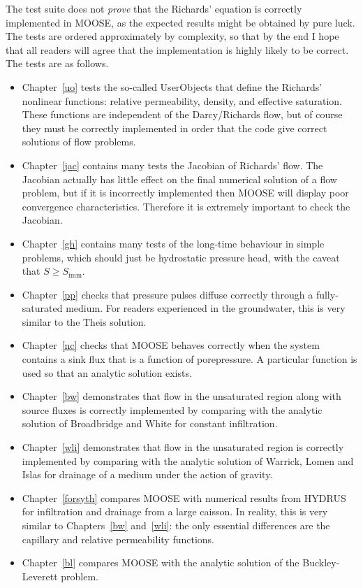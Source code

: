 \documentclass[]{scrreprt}
\begin{document}
The test suite does not {\em prove} that the Richards' equation is
correctly implemented in MOOSE, as the expected results might be
obtained by pure luck.  The tests are ordered approximately by
complexity, so that by the end I hope that all readers will agree that
the implementation is highly likely to be correct.  The tests are as
follows.
\begin{itemize}
\item Chapter~\ref{uo} tests the so-called UserObjects that define the
 Richards' nonlinear functions: relative permeability, density, and
 effective saturation.  These functions are independent of the
 Darcy/Richards flow, but of course they must be correctly implemented
 in order that the code give correct solutions of flow problems.
\item Chapter~\ref{jac} contains many tests the Jacobian of Richards'
  flow.  The Jacobian actually has little effect on the final
  numerical solution of a flow problem, but if it is incorrectly
  implemented then MOOSE will display poor convergence
  characteristics.  Therefore it is extremely important to check the
  Jacobian.
\item Chapter~\ref{gh} contains many tests of the long-time behaviour
  in simple problems, which should just be hydrostatic pressure head,
  with the caveat that $S\geq S_{\mathrm{imm}}$.
\item Chapter~\ref{pp} checks that pressure pulses diffuse correctly
  through a fully-saturated medium.  For readers experienced in the
  groundwater, this is very similar to the Theis solution.
\item Chapter~\ref{nc} checks that MOOSE behaves correctly when the
  system contains a sink flux that is a function of porepressure.  A
  particular function is used so that an analytic solution exists.
\item Chapter~\ref{bw} demonstrates that flow in the unsaturated
  region along with source fluxes is correctly implemented by comparing
  with the analytic solution of Broadbridge and White for constant
  infiltration.
\item Chapter~\ref{wli} demonstrates that flow in the unsaturated
  region is correctly implemented by comparing with the analytic
  solution of Warrick, Lomen and Islas for drainage of a medium under
  the action of gravity.
\item Chapter~\ref{forsyth} compares MOOSE with numerical results from
  HYDRUS for infiltration and drainage from a large caisson.  In
  reality, this is very similar to Chapters~\ref{bw} and~\ref{wli}:
  the only essential differences are the capillary and relative
  permeability functions.
\item Chapter~\ref{bl} compares MOOSE with the analytic solution of
  the Buckley-Leverett problem.
\end{itemize}
\end{document}
